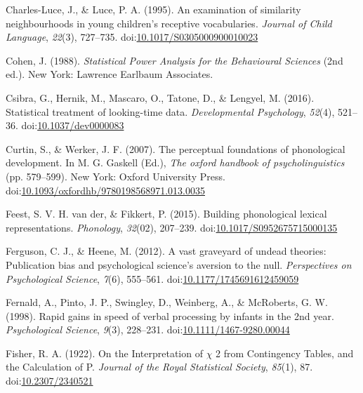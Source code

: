 \documentclass[
  man, noextraspace]{apa6}
\begin{document}
\leavevmode\hypertarget{ref-CharlesLuce1995}{}%
Charles-Luce, J., \& Luce, P. A. (1995). An examination of similarity neighbourhoods in young children's receptive vocabularies. \emph{Journal of Child Language}, \emph{22}(3), 727--735. doi:\href{https://doi.org/10.1017/S0305000900010023}{10.1017/S0305000900010023}

\leavevmode\hypertarget{ref-cohen}{}%
Cohen, J. (1988). \emph{Statistical Power Analysis for the Behavioural Sciences} (2nd ed.). New York: Lawrence Earlbaum Associates.

\leavevmode\hypertarget{ref-Csibra2016}{}%
Csibra, G., Hernik, M., Mascaro, O., Tatone, D., \& Lengyel, M. (2016). Statistical treatment of looking-time data. \emph{Developmental Psychology}, \emph{52}(4), 521--36. doi:\href{https://doi.org/10.1037/dev0000083}{10.1037/dev0000083}

\leavevmode\hypertarget{ref-Curtin2007}{}%
Curtin, S., \& Werker, J. F. (2007). The perceptual foundations of phonological development. In M. G. Gaskell (Ed.), \emph{The oxford handbook of psycholinguistics} (pp. 579--599). New York: Oxford University Press. doi:\href{https://doi.org/10.1093/oxfordhb/9780198568971.013.0035}{10.1093/oxfordhb/9780198568971.013.0035}

\leavevmode\hypertarget{ref-vanderFeest2015}{}%
Feest, S. V. H. van der, \& Fikkert, P. (2015). Building phonological lexical representations. \emph{Phonology}, \emph{32}(02), 207--239. doi:\href{https://doi.org/10.1017/S0952675715000135}{10.1017/S0952675715000135}

\leavevmode\hypertarget{ref-Ferguson2012}{}%
Ferguson, C. J., \& Heene, M. (2012). A vast graveyard of undead theories: Publication bias and psychological science's aversion to the null. \emph{Perspectives on Psychological Science}, \emph{7}(6), 555--561. doi:\href{https://doi.org/10.1177/1745691612459059}{10.1177/1745691612459059}

\leavevmode\hypertarget{ref-Fernald1998}{}%
Fernald, A., Pinto, J. P., Swingley, D., Weinberg, A., \& McRoberts, G. W. (1998). Rapid gains in speed of verbal processing by infants in the 2nd year. \emph{Psychological Science}, \emph{9}(3), 228--231. doi:\href{https://doi.org/10.1111/1467-9280.00044}{10.1111/1467-9280.00044}

\leavevmode\hypertarget{ref-Fisher1922}{}%
Fisher, R. A. (1922). On the Interpretation of \(\chi\) 2 from Contingency Tables, and the Calculation of P. \emph{Journal of the Royal Statistical Society}, \emph{85}(1), 87. doi:\href{https://doi.org/10.2307/2340521}{10.2307/2340521}
\end{document}
